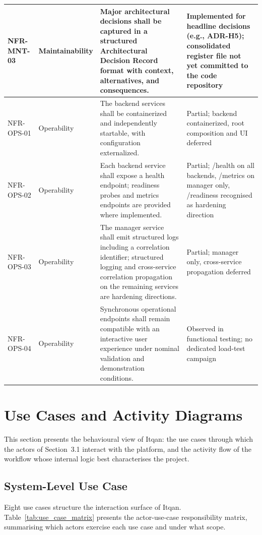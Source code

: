 \begin{xltabular}{\textwidth}{|p{2.2cm}|p{2.7cm}|>{\RaggedRight\arraybackslash}X|p{2.7cm}|}
NFR-MNT-03 & Maintainability & Major architectural decisions shall be captured in a structured Architectural Decision Record format with context, alternatives, and consequences. & Implemented for headline decisions (e.g., ADR-H5); consolidated register file not yet committed to the code repository \\ \hline
NFR-OPS-01 & Operability & The backend services shall be containerized and independently startable, with configuration externalized. & Partial; backend containerized, root composition and UI deferred \\ \hline
NFR-OPS-02 & Operability & Each backend service shall expose a health endpoint; readiness probes and metrics endpoints are provided where implemented. & Partial; /health on all backends, /metrics on manager only, /readiness recognised as hardening direction \\ \hline
NFR-OPS-03 & Operability & The manager service shall emit structured logs including a correlation identifier; structured logging and cross-service correlation propagation on the remaining services are hardening directions. & Partial; manager only, cross-service propagation deferred \\ \hline
NFR-OPS-04 & Operability & Synchronous operational endpoints shall remain compatible with an interactive user experience under nominal validation and demonstration conditions. & Observed in functional testing; no dedicated load-test campaign \\ \hline
\end{xltabular}
\endgroup

\section{Use Cases and Activity Diagrams}
This section presents the behavioural view of Itqan: the use cases through which the actors of Section~3.1 interact with the platform, and the activity flow of the workflow whose internal logic best characterises the project.

\subsection{System-Level Use Case}
Eight use cases structure the interaction surface of Itqan.
Table~\ref{tab:use_case_matrix} presents the actor-use-case
responsibility matrix, summarising which actors exercise each use case
and under what scope.

